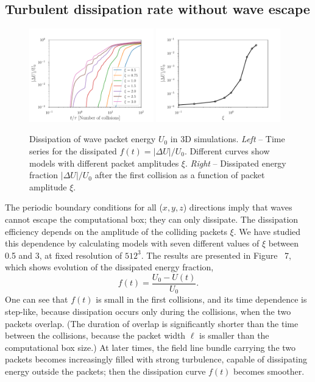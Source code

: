 \subsection{Turbulent dissipation rate without wave escape}
%
\begin{figure}
\centering
\includegraphics[width=0.48\textwidth]{pics/chap4/casrate3D}
\includegraphics[width=0.48\textwidth]{pics/chap4/dis_col}
\caption[Dissipation of \alfven wave packet energy $U_0$ in 3D simulations]{Dissipation of \alfven wave packet energy $U_0$ in 3D simulations.
\textit{Left} -- Time series for the dissipated $f(t)=|\Delta U|/U_0$. Different curves show models with different packet amplitudes $\xi$.
\textit{Right} -- Dissipated energy fraction $|\Delta U|/U_0$ after the first collision as a function of packet amplitude $\xi$.
}
\label{casraterate3D}
\end{figure}
%
The periodic boundary conditions for all ($x,y,z$) directions imply that waves cannot escape the computational box; they can only dissipate. The dissipation efficiency depends on the amplitude of the colliding \alfven packets $\xi$. We have studied this dependence by calculating models with seven different values of $\xi$ between 0.5 and $3$, at fixed resolution of $512^3$. The results are presented in Figure~ 7, which shows evolution of the dissipated energy fraction,
\begin{equation}
  f(t)=\frac{U_0-U(t)}{U_0}.
\end{equation}
One can see that $f(t)$ is small in the first collisions, and its time dependence is step-like, because dissipation occurs only during the collisions,
when the two packets overlap. (The  duration of overlap is significantly shorter than the time between the collisions, because the packet width $\ell$ is smaller than the computational box size.) At later times, the field line bundle carrying the two packets becomes increasingly filled with strong \alfven turbulence, capable of dissipating energy outside the packets; then the dissipation curve $f(t)$ becomes smoother.

